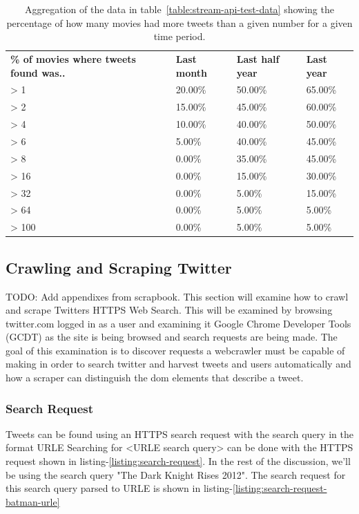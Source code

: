 \begin{table}[H]
\centering
\begin{tabularx}{5.3\textwidth}{ |p{7cm}|p{1cm}|p{1cm}|p{1cm}| }
\textbf{\% of movies where tweets found was..} & \textbf{Last month} & \textbf{Last half year} & \textbf{Last year}\\
  \cline{0-3}
> 1 & 20.00\% & 50.00\% & 65.00\%\\
  \cline{0-3}
> 2 & 15.00\% & 45.00\% & 60.00\%\\
  \cline{0-3}
> 4 & 10.00\% & 40.00\% & 50.00\%\\
  \cline{0-3}
> 6 & 5.00\% & 40.00\% & 45.00\%\\
  \cline{0-3}
> 8 & 0.00\% & 35.00\% & 45.00\%\\
  \cline{0-3}
> 16 & 0.00\% & 15.00\% & 30.00\%\\
  \cline{0-3}
> 32 & 0.00\% & 5.00\% & 15.00\%\\
  \cline{0-3}
> 64 & 0.00\% & 5.00\% & 5.00\%\\
  \cline{0-3}
> 100 & 0.00\% & 5.00\% & 5.00\%
\end{tabularx}
\caption{Aggregation of the data in table~\ref{table:stream-api-test-data} showing the percentage of how many movies had more tweets than a given number for a given time period.}
\label{table:stream-api-test-data-aggregate}
\end{table}




\subsection{Crawling and Scraping Twitter}\label{sec:pre-twitter-crawl-scrape}
TODO: Add appendixes from scrapbook.
This section will examine how to crawl and scrape Twitters HTTPS Web Search. This will be examined by browsing twitter.com logged in as a user and examining it Google Chrome Developer Tools (GCDT)\cite{gcdt} as the site is being browsed and search requests are being made. The goal of this examination is to discover requests a webcrawler must be capable of making in order to search twitter and harvest tweets and users automatically and how a scraper can distinguish the dom elements that describe a tweet.


\subsubsection{Search Request}
Tweets can be found using an HTTPS search request with the search query in the format URLE \cite{w3-urle-ref}
Searching for <URLE search query> can be done with the HTTPS request shown in listing-\ref{listing:search-request}.
In the rest of the discussion, we'll be using the search query "The Dark Knight Rises 2012". The search request for this search query parsed to URLE is shown in listing-\ref{listing:search-request-batman-urle}

